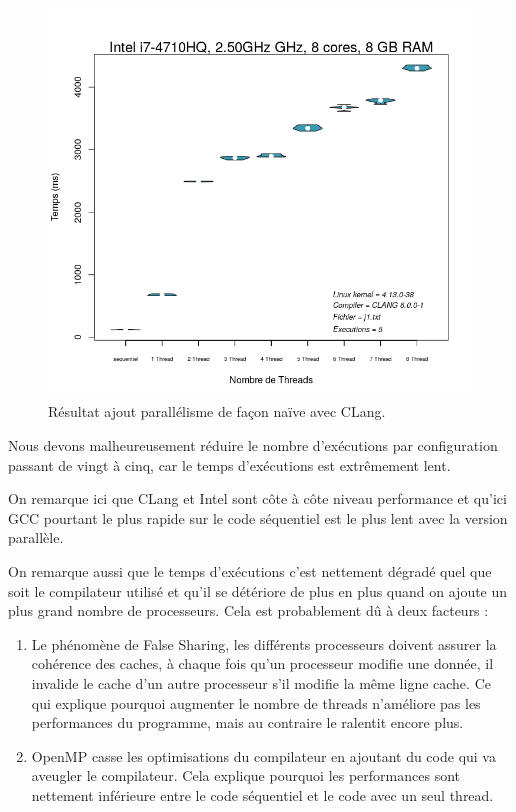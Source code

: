 \documentclass[
 aip,
 jmp,
 amsmath,amssymb,
 reprint
]{revtex4-1}
\begin{document}
\begin{figure}[H]
  \includegraphics[width=\linewidth, keepaspectratio=true]{clang_parallel_naif.png}
  \caption{Résultat ajout parallélisme de façon naïve avec CLang.\label{Fig:clang_naif}}
\end{figure}

Nous devons malheureusement réduire le nombre d'exécutions par configuration passant de vingt à cinq, car le temps d'exécutions est extrêmement lent.\par
On remarque ici que CLang\pageref{Fig:clang_naif} et Intel\pageref{Fig:intel_naif} sont côte à côte niveau performance et qu'ici GCC\pageref{Fig:gcc_naif} pourtant le plus rapide sur le code séquentiel est le plus lent avec la version parallèle.\par
On remarque aussi que le temps d'exécutions c'est nettement dégradé quel que soit le compilateur utilisé et qu'il se détériore de plus en plus quand on ajoute un plus grand nombre de processeurs. Cela est probablement dû à deux facteurs : 
\begin{enumerate}
\item Le phénomène de False Sharing\pageref{Fig:false_sharing}, les différents processeurs doivent assurer la cohérence des caches, à chaque fois qu'un processeur modifie une donnée, il invalide le cache d'un autre processeur s'il modifie la même ligne cache. Ce qui explique pourquoi augmenter le nombre de threads n'améliore pas les performances du programme, mais au contraire le ralentit encore plus.
\item OpenMP casse les optimisations du compilateur en ajoutant du code qui va aveugler le compilateur. Cela explique pourquoi les performances sont nettement inférieure entre le code séquentiel et le code avec un seul thread.
\end{enumerate}
\end{document}
